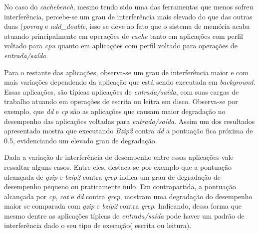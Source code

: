 No caso do \textit{cachebench}, mesmo tendo sido uma das ferramentas que menos sofreu interferência, percebe-se um grau de interferência mais elevado do que das outras duas (\textit{povray} e \textit{add\_double}, isso se deve ao fato que o sistema de memória acaba atuando principalmente em operações de \textit{cache} tanto em aplicações com perfil voltado para \textit{cpu} quanto em aplicações com perfil voltado para operações de \textit{entrada/saída}.

Para o restante das aplicações, observa-se um grau de interferência maior e com mais variações dependendo da aplicação que está sendo executada em \textit{background}. Essas aplicações, são típicas aplicações de \textit{entrada/saída}, com suas cargas de trabalho atuando em operações de escrita ou leitra em disco. Observa-se por exemplo, que \textit{dd} e \textit{cp} são as aplicações que causam maior degradação no desempenho das aplicações voltadas para \textit{entrada/saída}. Assim um dos resultados apresentado mostra que executando \textit{Bzip2} contra \textit{dd} a pontuação fica próxima de 0.5, evidenciando um elevado grau de degradação.


Dada a variação de interferência de desempenho entre essas aplicações vale ressaltar alguns casos. Entre eles, destaca-se por exemplo que a pontuação alcançada de \textit{gzip} e \textit{bzip2} contra \textit{grep} indica um grau de degradação de desempenho pequeno ou praticamente nulo. Em contrapartida, a pontuação alcançada por \textit{cp}, \textit{cat} e \textit{dd} contra \textit{grep}, mostram uma degradação do desempenho maior se comparada com \textit{gzip} e \textit{bzip2} contra \textit{grep}. Indicando, dessa forma que mesmo dentre as aplicações típicas de \textit{entrada/saída} pode haver um padrão de interferência dado o seu tipo de execução( escrita ou leitura). 



  

